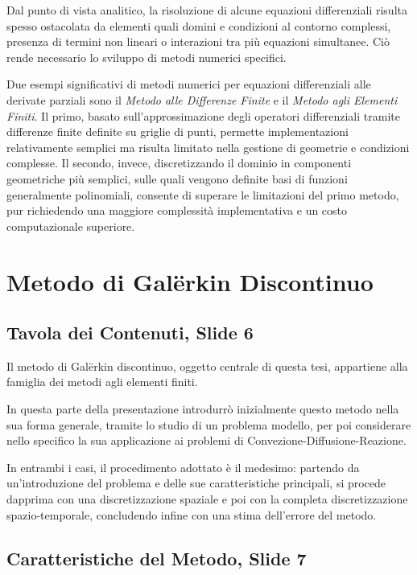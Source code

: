 \documentclass[12pt]{article}
\begin{document}
    Dal punto di vista analitico, la risoluzione di alcune equazioni differenziali risulta spesso ostacolata da elementi quali domini e condizioni al contorno complessi, presenza di termini non lineari o interazioni tra più equazioni simultanee. Ciò rende necessario lo sviluppo di metodi numerici specifici.

    Due esempi significativi di metodi numerici per equazioni differenziali alle derivate parziali sono il \textit{Metodo alle Differenze Finite} e il \textit{Metodo agli Elementi Finiti}. Il primo, basato sull'approssimazione degli operatori differenziali tramite differenze finite definite su griglie di punti, permette implementazioni relativamente semplici ma risulta limitato nella gestione di geometrie e condizioni complesse. Il secondo, invece, discretizzando il dominio in componenti geometriche più semplici, sulle quali vengono definite basi di funzioni generalmente polinomiali, consente di superare le limitazioni del primo metodo, pur richiedendo una maggiore complessità implementativa e un costo computazionale superiore.

    \newpage
    \section{Metodo di Galërkin Discontinuo}

    \subsection{Tavola dei Contenuti, Slide 6}

    Il metodo di Galërkin discontinuo, oggetto centrale di questa tesi, appartiene alla famiglia dei metodi agli elementi finiti.

    In questa parte della presentazione introdurrò inizialmente questo metodo nella sua forma generale, tramite lo studio di un problema modello, per poi considerare nello specifico la sua applicazione ai problemi di Convezione-Diffusione-Reazione.

    In entrambi i casi, il procedimento adottato è il medesimo: partendo da un'introduzione del problema e delle sue caratteristiche principali, si procede dapprima con una discretizzazione spaziale e poi con la completa discretizzazione spazio-temporale, concludendo infine con una stima dell'errore del metodo.

    \subsection{Caratteristiche del Metodo, Slide 7}
\end{document}
